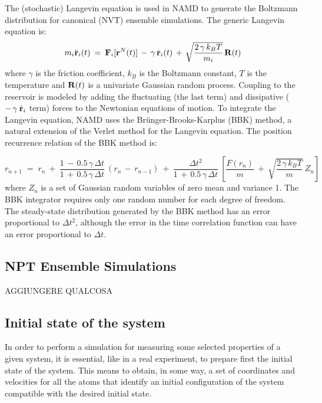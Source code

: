 The (stochastic) Langevin equation is used in NAMD to generate the Boltzmann distribution for canonical (NVT) ensemble simulations. The generic Langevin equation is:
\begin{equation}\label{eq:NVT-Langevin}
m_i \ddot{\bold{r}}_i(t) \:=\: \bold{F}_i[\bold{r}^N(t)] \,-\, \gamma \, \dot{\bold{r}}_i(t) \,+\, \sqrt{\frac{2 \, \gamma \, k_B T}{m_i}} \, \bold{R}(t)
\end{equation}
where $\gamma$ is the friction coefficient, $k_B$ is the Boltzmann constant, $T$ is the temperature and $\bold{R}(t)$ is a univariate Gaussian random process. Coupling to the reservoir is modeled by adding the fluctuating (the last term) and dissipative ($-\,  \gamma \: \dot{\bold{r}}_i $ term) forces to the Newtonian equations of motion. To integrate the Langevin equation, NAMD uses the Br\"{u}nger-Brooks-Karplus (BBK) method, a natural extension of the Verlet method for the Langevin equation. The position recurrence relation of the BBK method is:

\begin{equation}
r_{n+1} \;=\; r_n \:+\: \frac{1 \,-\, 0.5 \, \gamma \, \Delta t}{1 \,+\, 0.5 \, \gamma \, \Delta t} \: (r_n \,-\, r_{n-1}) \:+\: \frac{\Delta t^2}{1 \,+\, 0.5 \, \gamma \, \Delta t} \: \left[ \frac{F(r_n)}{m} \:+\: \sqrt{\frac{2\, \gamma \, k_B T}{m}} \: Z_n \right]
\end{equation}
where $Z_n$ is a set of Gaussian random variables of zero mean and variance 1. The BBK integrator requires only one random number for each degree of freedom. The steady-state distribution generated by the BBK method has an error proportional to $\Delta t^2$, although the error in the time correlation function can have an error proportional to $\Delta t$.

\subsection{NPT Ensemble Simulations}
AGGIUNGERE QUALCOSA

\subsection{Initial state of the system}
In order to perform a simulation for measuring some selected properties of a given system, it is essential, like in a real experiment, to prepare first the initial state of the system. 
This means to obtain, in some way, a set of coordinates and velocities for all the atoms that identify an initial configuration of the system compatible with the desired initial state.

